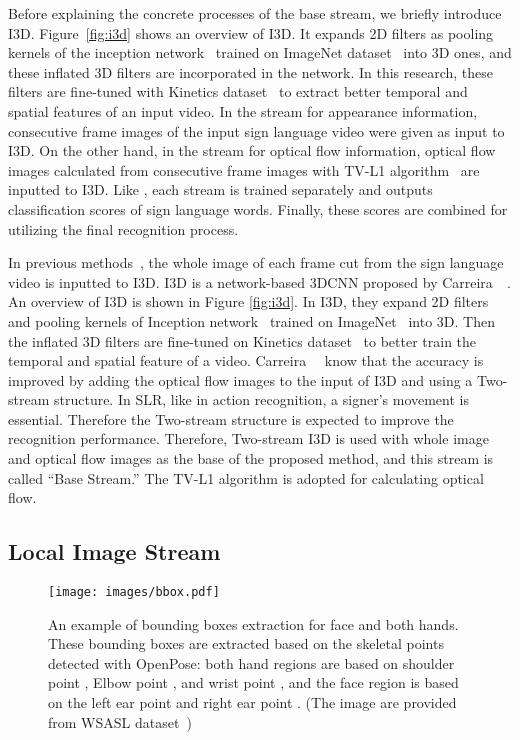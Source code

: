 \documentclass[journal]{IEEEtran}
\begin{document}
Before explaining the concrete processes of the base stream, we briefly introduce I3D. Figure~\ref{fig:i3d} shows an overview of I3D. It expands 2D filters as pooling kernels of the inception network~\cite{chris2014incep} trained on ImageNet dataset~\cite{olga2015imagenet} into 3D ones, and these inflated 3D filters are incorporated in the network.  In this research, these filters are fine-tuned with Kinetics dataset~\cite{joao2017i3d} to extract better temporal and spatial features of an input video. In the stream for appearance information,  consecutive frame images of the input sign language video were given as input to I3D. On the other hand, in the stream for optical flow information,  optical flow images calculated from  consecutive frame images with TV-L1 algorithm~\cite{zach2007tvl1} are inputted to I3D. Like \cite{tu2018mscnn, bilen2018multi, zang2018multi}, each stream is trained separately and outputs classification scores of sign language words. Finally, these scores are combined for utilizing the final recognition process. 

In previous methods~\cite{li2020word,vaezi2019ms-asl}, the whole image of each frame cut from the sign language video is inputted to I3D. I3D is a network-based 3DCNN proposed by Carreira~\etal~\cite{joao2017i3d}. An overview of I3D is shown in Figure \ref{fig:i3d}. In I3D, they expand 2D filters and pooling kernels of Inception network~\cite{chris2014incep} trained on ImageNet~\cite{olga2015imagenet} into 3D. Then the inflated 3D filters are fine-tuned on Kinetics dataset~\cite{joao2017i3d} to better train the temporal and spatial feature of a video. Carreira~\etal~\cite{joao2017i3d} know that the accuracy is improved by adding the optical flow images to the input of I3D and using a Two-stream structure. In SLR, like in action recognition, a signer's movement is essential. Therefore the Two-stream structure is expected to improve the recognition performance. Therefore, Two-stream I3D is used with whole image and optical flow images as the base of the proposed method, and this stream is called ``Base Stream.'' The TV-L1 algorithm is adopted for calculating optical flow.
\fi




\subsection{Local Image Stream}

\begin{figure}[tb]
  \centering
    \texttt{[image: images/bbox.pdf]}
    \caption{An example of bounding boxes extraction for face and both hands.
    These bounding boxes are extracted based on the skeletal points detected with OpenPose: 
    both hand regions are based on shoulder point , Elbow point , and wrist point , and the face region is based on the left ear point  and right ear point . 
    (The image are provided from WSASL dataset~\cite{li2020word})}
    \label{fig:bbox}
\end{figure}
\end{document}
